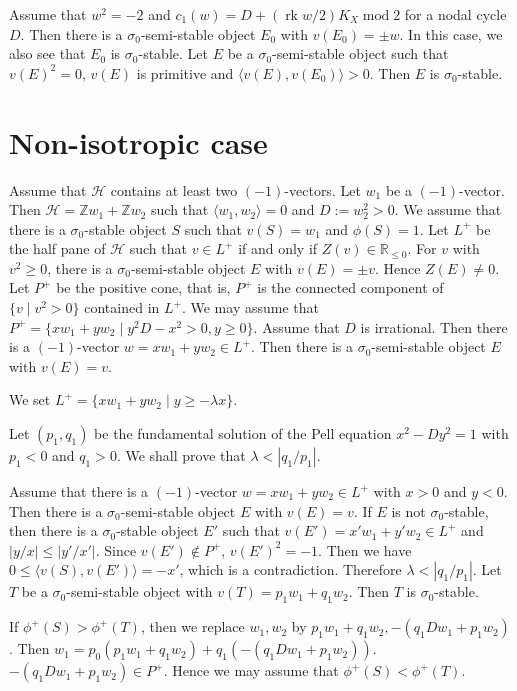 \documentclass[leqno,11pt]{amsart}
\def\R{\ensuremath{\mathbb{R}}}
\def\Z{\ensuremath{\mathbb{Z}}}
\def\mod{\mathop{\mathrm{mod}}\nolimits}
\def\rk{\mathop{\mathrm{rk}}}
\theoremstyle{definition}
\def\R{\ensuremath{\mathbb{R}}}
\def\Z{\ensuremath{\mathbb{Z}}}
\def\HH{\ensuremath{\mathcal H}}
\begin{document}
Assume that $w^2=-2$ and $c_1(w)=D+(\rk w/2)K_X \mod 2$
for a nodal cycle $D$.
Then there is a $\sigma_0$-semi-stable object
$E_0$ with $v(E_0)=\pm w$.
In this case, we also see that $E_0$ is $\sigma_0$-stable.
 Let $E$ be a $\sigma_0$-semi-stable object such that
$v(E)^2=0$, $v(E)$ is primitive and
$\langle v(E),v(E_0) \rangle>0$.
Then $E$ is $\sigma_0$-stable.


\section{Non-isotropic case}
Assume that $\HH$ contains at least two $(-1)$-vectors.
Let $w_1$ be a $(-1)$-vector. Then $\HH=\Z w_1+\Z w_2$
such that $\langle w_1,w_2 \rangle=0$ and $D:=w_2^2>0$.
We assume that there is a $\sigma_0$-stable object $S$ such that $v(S)=w_1$
and $\phi(S)=1$.
Let $L^+$ be the half pane of $\HH$ such  that
$v \in L^+$ if and only if $Z(v) \in \R_{\leq 0}$. 
For $v$ with $v^2 \geq 0$, there is a $\sigma_0$-semi-stable
object $E$ with $v(E)=\pm v$. Hence $Z(E) \ne 0$.
Let $P^+$ be the positive cone, that is, $P^+$ is the connected component
of $\{ v \mid v^2>0 \}$ contained in $L^+$.
We may assume that $P^+=\{xw_1+yw_2 \mid y^2 D-x^2>0, y \geq 0 \}$.
Assume that $D$ is irrational. 
Then
there is a $(-1)$-vector $w=x w_1+yw_2 \in L^+$.
Then
there is a $\sigma_0$-semi-stable object $E$ with $v(E)=v$.

We set $L^+ = \{x w_1+y w_2 \mid y \geq-\lambda x \}$.





Let $(p_1,q_1)$ be the fundamental solution of the Pell equation
$x^2-Dy^2=1$ with $p_1<0$ and $q_1>0$.
We shall prove that $\lambda<|q_1/p_1|$.


Assume that there is a $(-1)$-vector $w=x w_1+yw_2 \in L^+$
with $x>0$ and $y<0$.
Then
there is a $\sigma_0$-semi-stable object $E$ with $v(E)=v$.
If $E$ is not $\sigma_0$-stable, then
there is a $\sigma_0$-stable object $E'$ such that $v(E')=x' w_1+y' w_2 \in L^+$
and  $|y/x| \leq |y'/x'|$.
Since $v(E') \not \in P^+$, $v(E')^2=-1$.
Then we have $0 \leq \langle v(S),v(E') \rangle =-x'$,
which is a contradiction.
Therefore $\lambda<|q_1/p_1|$. Let $T$ be a $\sigma_0$-semi-stable
object with $v(T)=p_1 w_1+q_1 w_2$.
Then $T$ is $\sigma_0$-stable.
 
If $\phi^+(S)>\phi^+(T)$, then we replace
$w_1,w_2$ by $p_1 w_1+q_1 w_2, -(q_1 D w_1+p_1 w_2)$.
Then $w_1=p_0(p_1 w_1+q_1 w_2)+q_1( -(q_1 D w_1+p_1 w_2))$.
$-(q_1 D w_1+p_1 w_2) \in P^+$.
Hence we may assume that $\phi^+(S)<\phi^+(T)$.
\end{document}
